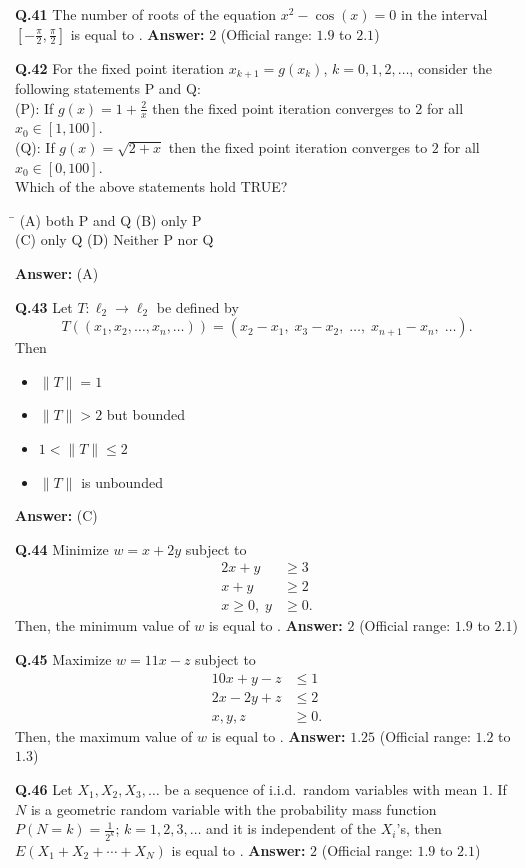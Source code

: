 \documentclass[11pt,a4paper]{article}
\newcommand{\optsfourA}[4]{%
  \begin{tabbing}
    \hspace{0.48\linewidth}\=\kill
    (A) #1 \> (B) #2 \\[2pt]
    (C) #3 \> (D) #4
  \end{tabbing}%
}
\newcommand{\optslistA}[4]{%
  \begin{itemize}
    \setlength{\itemsep}{2pt}\setlength{\parskip}{0pt}
    \item[(A)] #1
    \item[(B)] #2
    \item[(C)] #3
    \item[(D)] #4
  \end{itemize}%
}
\newcommand{\ans}[1]{\textbf{Answer:} #1\par\medskip}
\begin{document}
\textbf{Q.41} The number of roots of the equation $x^2 - \cos(x) = 0$ in the interval $\left[-\frac{\pi}{2}, \frac{\pi}{2}\right]$ is equal to \underline{\hspace{2cm}}.
\ans{$2$ (Official range: $1.9$ to $2.1$)}

\textbf{Q.42} For the fixed point iteration $x_{k+1} = g(x_k)$, $k = 0, 1, 2, \dots$, consider the following statements P and Q:\\
(P): If $g(x) = 1 + \frac{2}{x}$ then the fixed point iteration converges to $2$ for all $x_0 \in [1, 100]$.\\
(Q): If $g(x) = \sqrt{2 + x}$ then the fixed point iteration converges to $2$ for all $x_0 \in [0, 100]$.\\
Which of the above statements hold TRUE?
\optsfourA{both P and Q}{only P}{only Q}{Neither P nor Q}
\ans{(A)}

\textbf{Q.43} Let $T : \ell_2 \to \ell_2$ be defined by
\[
  T((x_1, x_2, \dots, x_n, \dots)) = (x_2 - x_1,\; x_3 - x_2,\; \dots,\; x_{n+1} - x_n,\; \dots).
\]
Then
\optslistA{$\|T\| = 1$}{$\|T\| > 2$ but bounded}{$1 < \|T\| \le 2$}{$\|T\|$ is unbounded}
\ans{(C)}

\textbf{Q.44} Minimize $w = x + 2y$ subject to
\begin{align*}
  2x + y &\ge 3 \\
  x + y &\ge 2 \\
  x \ge 0,\; y &\ge 0.
\end{align*}
Then, the minimum value of $w$ is equal to \underline{\hspace{2cm}}.
\ans{$2$ (Official range: $1.9$ to $2.1$)}

\textbf{Q.45} Maximize $w = 11x - z$ subject to
\begin{align*}
  10x + y - z &\le 1 \\
  2x - 2y + z &\le 2 \\
  x, y, z &\ge 0.
\end{align*}
Then, the maximum value of $w$ is equal to \underline{\hspace{2cm}}.
\ans{$1.25$ (Official range: $1.2$ to $1.3$)}

\textbf{Q.46} Let $X_1, X_2, X_3, \dots$ be a sequence of i.i.d.\ random variables with mean $1$. If $N$ is a geometric random variable with the probability mass function $P(N = k) = \frac{1}{2^k}$; $k = 1, 2, 3, \dots$ and it is independent of the $X_i$'s, then $E(X_1 + X_2 + \cdots + X_N)$ is equal to \underline{\hspace{2cm}}.
\ans{$2$ (Official range: $1.9$ to $2.1$)}
\end{document}
